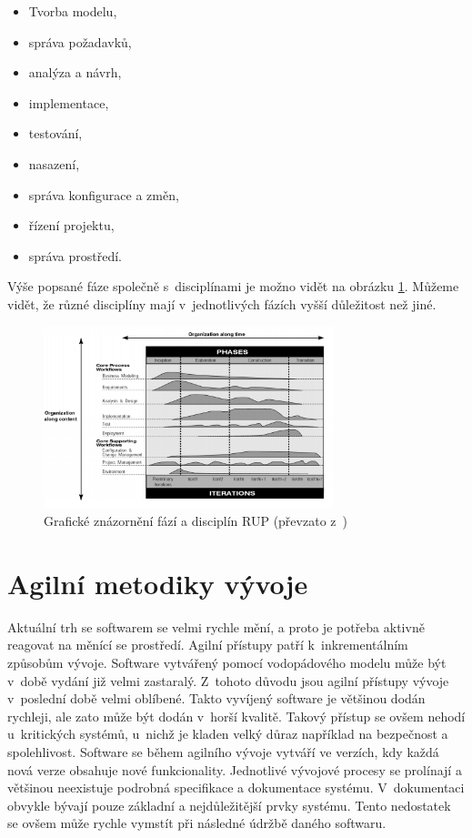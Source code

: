 \documentclass[czech,master]{diploma}
\begin{document}
\begin{itemize}
\item Tvorba modelu,
\item správa požadavků,
\item analýza a návrh,
\item implementace,
\item testování,
\item nasazení,
\item správa konfigurace a změn,
\item řízení projektu,
\item správa prostředí.
\end{itemize}

Výše popsané fáze společně s~disciplínami je možno vidět na obrázku \ref{fig:rup}. Můžeme vidět, že různé disciplíny mají v~jednotlivých fázích vyšší důležitost než jiné.

\begin{figure}[!ht]
    \centering
    \includegraphics[width=0.75\textwidth]{Diplomka/Figures/rup.png}
    \caption{Grafické znázornění fází a disciplín RUP (převzato z~\cite{ref:rup_ibm})}
    \label{fig:rup}
\end{figure}

\section{Agilní metodiky vývoje}
Aktuální trh se softwarem se velmi rychle mění, a proto je potřeba aktivně reagovat na měnící se prostředí. Agilní přístupy patří k~inkrementálním způsobům vývoje. Software vytvářený pomocí vodopádového modelu může být v~době vydání již velmi zastaralý. Z~tohoto důvodu jsou agilní přístupy vývoje v~poslední době velmi oblíbené. Takto vyvíjený software je většinou dodán rychleji, ale zato může být dodán v~horší kvalitě. Takový přístup se ovšem nehodí u~kritických systémů, u~nichž je kladen velký důraz například na bezpečnost a spolehlivost. Software se během agilního vývoje vytváří ve verzích, kdy každá nová verze obsahuje nové funkcionality. Jednotlivé vývojové procesy se prolínají a většinou neexistuje podrobná specifikace a dokumentace systému. V~dokumentaci obvykle bývají pouze základní a nejdůležitější prvky systému. Tento nedostatek se ovšem může rychle vymstít při následné údržbě daného softwaru.
\end{document}
